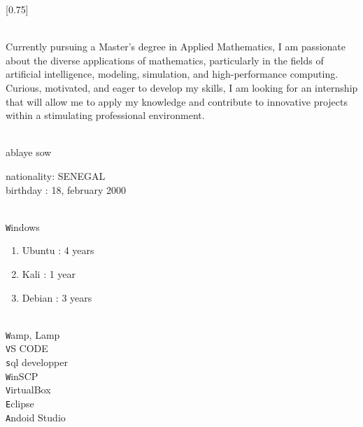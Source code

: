\documentclass[lighthipster]{simplehipstercv}
\begin{document}
\setlength{\columnsep}{1.5cm}
[0.75]
\begin{paracol}{2}

\paracolbackgroundoptions



\footnotesize
{\setasidefontcolour
\flushright
\begin{center}
\end{center}
\begin{flushleft}
\\[0.4em]

{\footnotesize
Currently pursuing a Master's degree in Applied Mathematics, I am passionate about the diverse applications of mathematics, particularly in the fields of artificial intelligence, modeling, simulation, and high-performance computing. Curious, motivated, and eager to develop my skills, I am looking for an internship that will allow me to apply my knowledge and contribute to innovative projects within a stimulating professional environment.}
\bigskip

 \\[0.5em]
ablaye sow

nationality: SENEGAL\\
birthday : 18, february 2000

\bigskip

 \\[0.5em]

\texttt Windows\\
\begin{enumerate}
    \item Ubuntu : 4 years
    \item Kali : 1 year
    \item Debian : 3 years
\end{enumerate}

 \\[0.5em]

\texttt Wamp, Lamp\\
\texttt VS CODE\\
\texttt sql developper\\
\texttt WinSCP\\
\texttt VirtualBox\\
\texttt Eclipse\\
\texttt Andoid Studio\\


\end{flushleft}}
\end{paracol}
\end{document}
